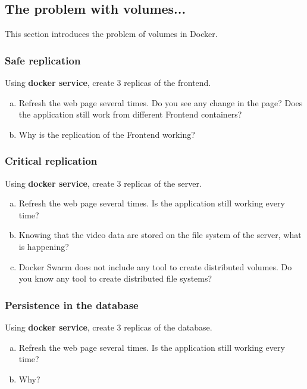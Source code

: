 \documentclass[a4paper,11pt]{exam}
\begin{document}
\subsection{The problem with volumes...}

This section introduces the problem of volumes in Docker.

\subsubsection{Safe replication}

\begin{questions}
	\question Using \textbf{docker service}, create 3 replicas of the frontend.
	\begin{enumerate}[(a)]
		\item Refresh the web page several times. Do you see any change in the page? Does the application still work from different Frontend containers?
		\item Why is the replication of the Frontend working?
	\end{enumerate}
\end{questions}

\subsubsection{Critical replication}

\begin{questions}
	\question Using \textbf{docker service}, create 3 replicas of the server.
	\begin{enumerate}[(a)]
		\item Refresh the web page several times. Is the application still working every time?
		\item Knowing that the video data are stored on the file system of the server, what is happening?
		\item Docker Swarm does not include any tool to create distributed volumes. Do you know any tool to create distributed file systems?
	\end{enumerate}
\end{questions}

\subsubsection{Persistence in the database}

\begin{questions}
	\question Using \textbf{docker service}, create 3 replicas of the database.
	\begin{enumerate}[(a)]
		\item Refresh the web page several times. Is the application still working every time?
		\item Why?
	\end{enumerate}
\end{questions}
\end{document}
